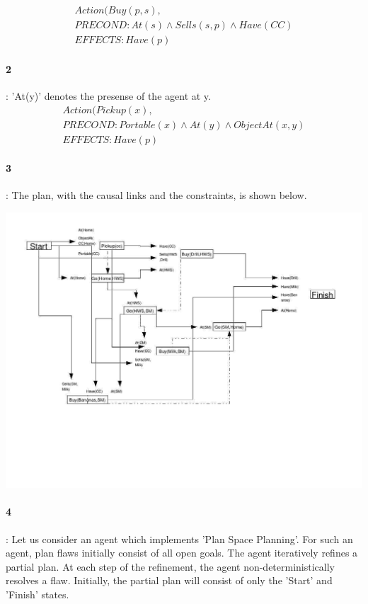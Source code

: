 \documentclass[10pt]{article}
\begin{document}
\begin{eqnarray}
Action( Buy(p,s), \\
PRECOND: At(s) \wedge Sells(s,p) \wedge Have(CC)\\
EFFECTS: Have(p)
\end{eqnarray}

\paragraph{2}: 'At(y)' denotes the presense of the agent at y.
\begin{eqnarray}
Action( Pickup(x), \\
PRECOND: Portable(x) \wedge At(y) \wedge ObjectAt(x,y)\\
EFFECTS: Have(p)
\end{eqnarray}

\paragraph{3}: The plan, with the causal links and the constraints, is shown below.

\begin{center}
 \includegraphics[scale=0.4, angle=90]{pop.jpg}
\end{center}

\paragraph{4}: Let us consider an agent which implements 'Plan Space Planning'. For such an agent, plan flaws initially consist of all open goals. The agent iteratively refines a partial plan. At each step of the refinement, the agent non-deterministically resolves a flaw. Initially, the partial plan will consist of only the 'Start' and 'Finish' states.
\end{document}
